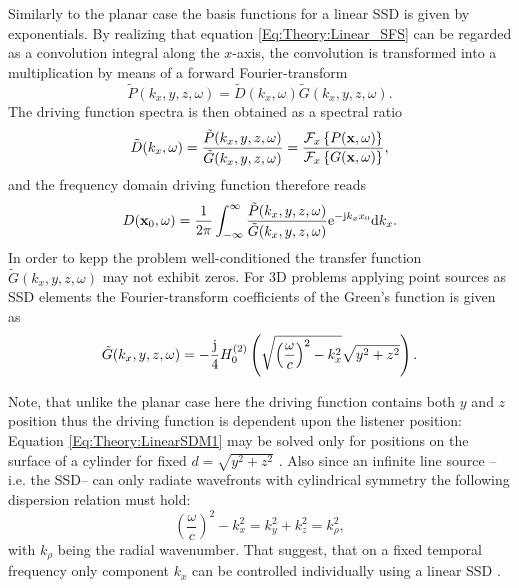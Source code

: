Similarly to the planar case the basis functions for a linear SSD is given by exponentials.
By realizing that equation \eqref{Eq:Theory:Linear_SFS} can be regarded as a convolution integral along the $x$-axis,
the convolution is transformed into a multiplication by means of a forward Fourier-transform
\begin{equation}
\tilde{P}(k_x,y,z, \omega) = \tilde{D}(k_x,\omega)\tilde{G}(k_x,y,z, \omega).
\end{equation}
The driving function spectra is then obtained as a spectral ratio
\begin{equation}
\tilde{D}(k_x,\omega) = \frac{\tilde{P}(k_x,y,z, \omega)}{\tilde{G}(k_x,y,z, \omega)} = \frac{\mathcal{F}_x\left\{ P(\mathbf{x},\omega) \right\}}{\mathcal{F}_x\left\{ G(\mathbf{x},\omega) \right\}},
\end{equation}
and the frequency domain driving function therefore reads
\begin{equation}
D(\mathbf{x}_0,\omega) = \frac{1}{2\pi} \int_{-\infty}^{\infty} \frac{\tilde{P}(k_x,y,z, \omega) }{\tilde{G}(k_x,y,z, \omega)} \mathrm{e}^{-\mathrm{j} k_x x_0} \mathrm{d} k_x.
\label{Eq:Theory:LinearSDM1}
\end{equation}
In order to kepp the problem well-conditioned the transfer function $\tilde{G}(k_x,y,z, \omega)$ may not exhibit zeros.
For 3D problems applying point sources as SSD elements the Fourier-transform coefficients of the Green's function is given as \cite{Ahrens2010a}
\begin{equation}
\tilde{G}(k_x,y,z,\omega) = -\frac{\mathrm{j}}{4} H_0^{(2)}\left( \sqrt{ \left( \frac{\omega}{c} \right)^2 - k_x^2 } \sqrt{ y^2 + z^2 } \right).
\end{equation}

\vspace{3mm}
Note, that unlike the planar case here the driving function contains both $y$ and $z$ position thus the driving function is dependent upon the listener position: Equation \eqref{Eq:Theory:LinearSDM1} may be solved only for positions on the surface of a cylinder for fixed $d = \sqrt{y^2 + z^2}$ \cite[p.~60.]{Ahrens2010phd}.
Also since an infinite line source --i.e. the SSD-- can only radiate wavefronts with cylindrical symmetry the following  dispersion relation must hold:
\begin{equation}
\left( \frac{\omega} {c}\right)^2 - k_x^2 = k_y^2 + k_z^2 = k_{\rho}^2,
\end{equation}
with $k_{\rho}$ being the radial wavenumber. That suggest, that on a fixed temporal frequency only component $k_x$ can be controlled individually using a linear SSD .


